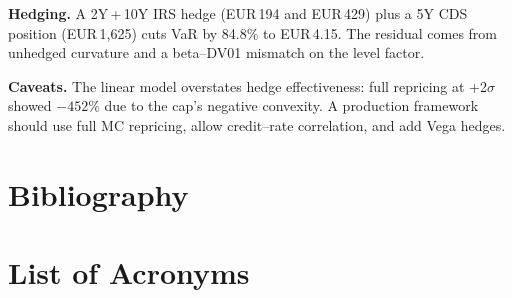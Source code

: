 \documentclass[11pt,a4paper]{article}
\begin{document}
\noindent\textbf{Hedging.}\quad
A 2Y\,+\,10Y IRS hedge (EUR\,194 and EUR\,429) plus a
5Y CDS position (EUR\,1,625) cuts VaR by 84.8\% to
EUR\,4.15.  The residual comes from unhedged curvature
and a beta--DV01 mismatch on the level factor.

\noindent\textbf{Caveats.}\quad
The linear model overstates hedge effectiveness:
full repricing at +2$\sigma$ showed $-452\%$ due to
the cap's negative convexity.  A production framework
should use full MC repricing, allow credit--rate
correlation, and add Vega hedges.

\newpage
\section{Bibliography}
\printbibliography[heading=none]



\newpage
\appendix
\section{List of Acronyms}
\label{sec:acronyms}
\end{document}
